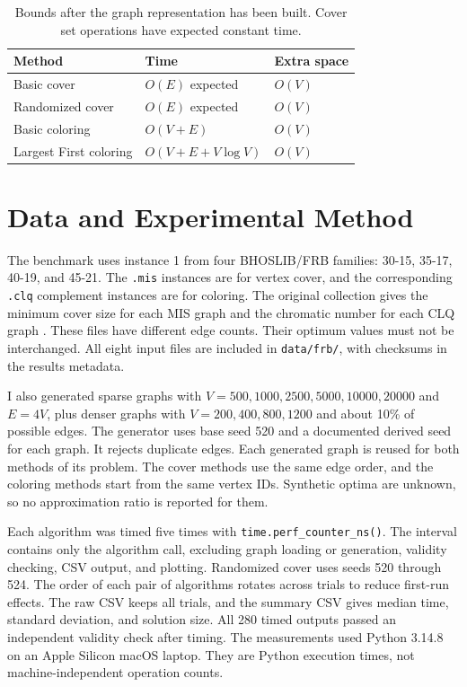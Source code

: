 \documentclass[acmsmall,nonacm]{acmart}
\begin{document}
\begin{table}[t]
\caption{Bounds after the graph representation has been built. Cover set operations have expected constant time.}
\label{tab:complexity}
\centering\small
\begin{tabular}{@{}lll@{}}
\toprule
Method & Time & Extra space \\
\midrule
Basic cover & $O(E)$ expected & $O(V)$ \\
Randomized cover & $O(E)$ expected & $O(V)$ \\
Basic coloring & $O(V+E)$ & $O(V)$ \\
Largest First coloring & $O(V+E+V\log V)$ & $O(V)$ \\
\bottomrule
\end{tabular}
\end{table}

\section{Data and Experimental Method}
The benchmark uses instance 1 from four BHOSLIB/FRB families: 30-15, 35-17, 40-19, and 45-21. The \texttt{.mis} instances are for vertex cover, and the corresponding \texttt{.clq} complement instances are for coloring. The original collection gives the minimum cover size for each MIS graph and the chromatic number for each CLQ graph \cite{bhoslib}. These files have different edge counts. Their optimum values must not be interchanged. All eight input files are included in \texttt{data/frb/}, with checksums in the results metadata.

I also generated sparse graphs with $V=500,1000,2500,5000,10000,20000$ and $E=4V$, plus denser graphs with $V=200,400,800,1200$ and about 10\% of possible edges. The generator uses base seed 520 and a documented derived seed for each graph. It rejects duplicate edges. Each generated graph is reused for both methods of its problem. The cover methods use the same edge order, and the coloring methods start from the same vertex IDs. Synthetic optima are unknown, so no approximation ratio is reported for them.

Each algorithm was timed five times with \texttt{time.perf\_counter\_ns()}. The interval contains only the algorithm call, excluding graph loading or generation, validity checking, CSV output, and plotting. Randomized cover uses seeds 520 through 524. The order of each pair of algorithms rotates across trials to reduce first-run effects. The raw CSV keeps all trials, and the summary CSV gives median time, standard deviation, and solution size. All 280 timed outputs passed an independent validity check after timing. The measurements used Python 3.14.8 on an Apple Silicon macOS laptop. They are Python execution times, not machine-independent operation counts.
\end{document}
